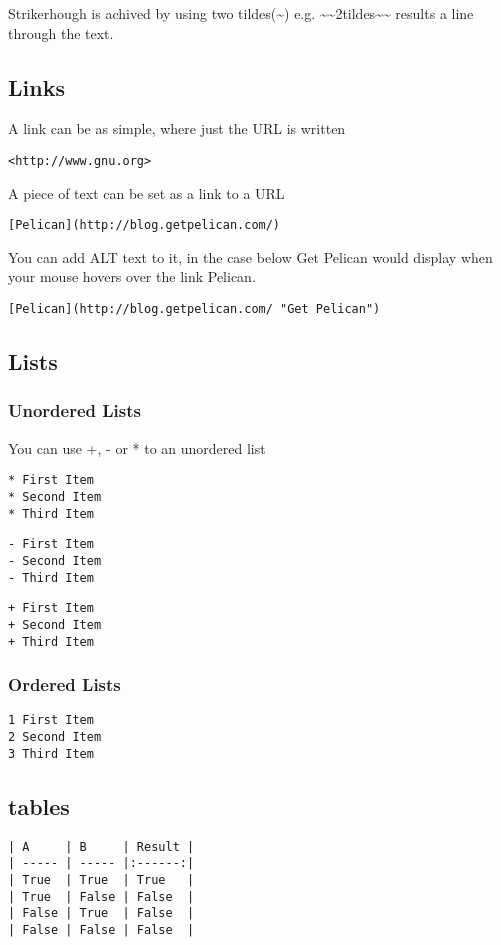 \documentclass[12pt]{article}			%
\begin{document}
Strikerhough is achived by using two tildes(\~{}) e.g. \~{}\~{}2tildes\~{}\~{} results a line through the text.

\subsection{Links}
A link can be as simple, where just the URL is written 
\begin{verbatim}
<http://www.gnu.org>
\end{verbatim}
A piece of text can be set as a link to a URL
\begin{verbatim}
[Pelican](http://blog.getpelican.com/)
\end{verbatim}
You can add ALT text to it, in the case below Get Pelican would display when your mouse hovers over the link Pelican.
\begin{verbatim}
[Pelican](http://blog.getpelican.com/ "Get Pelican")
\end{verbatim}
\subsection{Lists}
\subsubsection{Unordered Lists}
You can use +, - or * to an unordered list
\begin{verbatim}
* First Item
* Second Item
* Third Item
\end{verbatim}
\begin{verbatim}
- First Item
- Second Item
- Third Item
\end{verbatim}
\begin{verbatim}
+ First Item
+ Second Item
+ Third Item
\end{verbatim}
\subsubsection{Ordered Lists}
\begin{verbatim}
1 First Item
2 Second Item
3 Third Item
\end{verbatim}

\subsection{tables}

\begin{verbatim}
| A     | B     | Result |
| ----- | ----- |:------:|
| True  | True  | True   |
| True  | False | False  |
| False | True  | False  |
| False | False | False  |

\end{verbatim}
\end{document}
